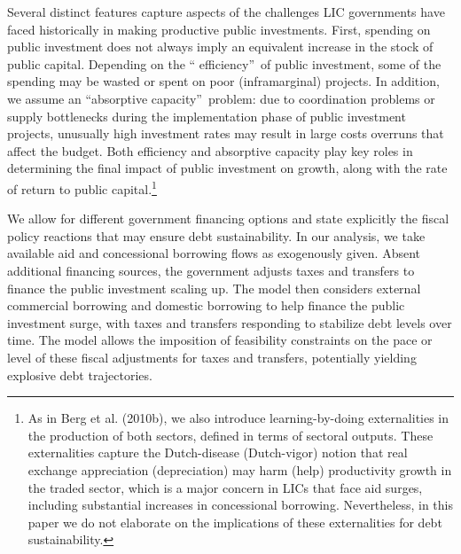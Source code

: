 \documentclass[11pt]{article}
\begin{document}
Several distinct features capture aspects of the challenges LIC governments
have faced historically in making productive public investments. First,
spending on public investment does not always imply an equivalent increase
in the stock of public capital. Depending on the \textquotedblleft
efficiency\textquotedblright\ of public investment, some of the spending may
be wasted or spent on poor (inframarginal) projects. In addition, we assume
an \textquotedblleft absorptive capacity\textquotedblright\ problem: due to
coordination problems or supply bottlenecks during the implementation phase
of public investment projects, unusually high investment rates may result in
large costs overruns that affect the budget. Both efficiency and absorptive
capacity play key roles in determining the final impact of public investment
on growth, along with the rate of return to public capital.\footnote{%
As in Berg et al. (2010b), we also introduce learning-by-doing externalities
in the production of both sectors, defined in terms of sectoral outputs.
These externalities capture the Dutch-disease (Dutch-vigor) notion that real
exchange appreciation (depreciation) may harm (help) productivity growth in
the traded sector, which is a major concern in LICs that face aid surges,
including substantial increases in concessional borrowing. Nevertheless, in
this paper we do not elaborate on the implications of these externalities
for debt sustainability.}

We allow for different government financing options and state explicitly the
fiscal policy reactions that may ensure debt sustainability. In our
analysis, we take available aid and concessional borrowing flows as
exogenously given. Absent additional financing sources, the government
adjusts taxes and transfers to finance the public investment scaling up. The
model then considers external commercial borrowing and domestic borrowing to
help finance the public investment surge, with taxes and transfers
responding to stabilize debt levels over time. The model allows the
imposition of feasibility constraints on the pace or level of these fiscal
adjustments for taxes and transfers, potentially yielding explosive debt
trajectories.
\end{document}
